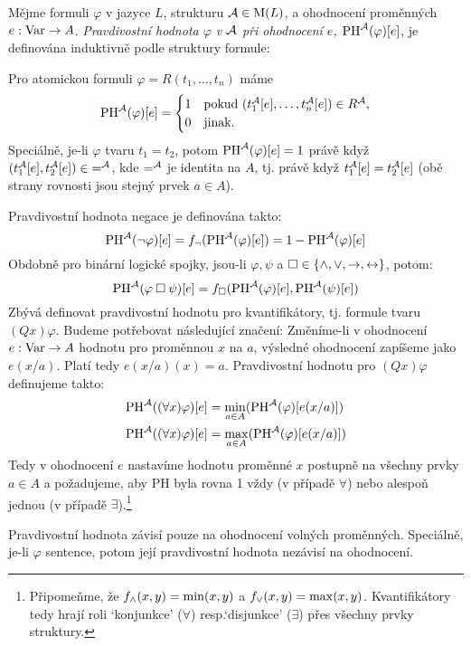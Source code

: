 \begin{definition}
Mějme formuli $\varphi$ v jazyce $L$, strukturu $\mathcal{A}\in\operatorname{M}(L)$,  a ohodnocení proměnných $e:\operatorname{Var}\to A$. \emph{Pravdivostní hodnota $\varphi$ v $\mathcal{A}$ při ohodnocení $e$, $\mathrm{PH}^{\mathcal{A}}(\varphi)[e]$}, je definována induktivně podle struktury formule:

Pro atomickou formuli $\varphi=R(t_1,\dots,t_n)$ máme 
$$
\mathrm{PH}^{\mathcal{A}}(\varphi)[e]=
\begin{cases}
    1 & \text{pokud }(t_1^{\mathcal{A}}[e],\dots,t_n^{\mathcal{A}}[e])\in R^{\mathcal{A}},\\
    0 & \text{jinak.}    
\end{cases}
$$
Speciálně, je-li $\varphi$ tvaru $t_1=t_2$, potom $\mathrm{PH}^{\mathcal{A}}(\varphi)[e]=1$ právě když $(t_1^{\mathcal{A}}[e],t_2^{\mathcal{A}}[e])\in {=^{\mathcal{A}}}$, kde $=^{\mathcal{A}}$ je identita na $A$, tj. právě když $t_1^{\mathcal{A}}[e]=t_2^{\mathcal{A}}[e]$ (obě strany rovnosti jsou stejný prvek $a\in A$).

Pravdivostní hodnota negace je definována takto:
$$
\mathrm{PH}^{\mathcal{A}}(\neg \varphi)[e]=f_\neg(\mathrm{PH}^{\mathcal{A}}(\varphi)[e])=1-\mathrm{PH}^{\mathcal{A}}(\varphi)[e]
$$
Obdobně pro binární logické spojky, jsou-li $\varphi,\psi$ a ${\mathbin{\square}}\in\{{\land},{\lor},{\mathbin{\rightarrow}},{\mathbin{\leftrightarrow}}\}$, potom:
$$
\mathrm{PH}^{\mathcal{A}}(\varphi\mathbin{\square}\psi)[e]=f_{\mathbin{\square}}(\mathrm{PH}^{\mathcal{A}}(\varphi)[e],\mathrm{PH}^{\mathcal{A}}(\psi)[e])
$$
Zbývá definovat pravdivostní hodnotu pro kvantifikátory, tj. formule tvaru $(Qx)\varphi$. Budeme potřebovat následující značení: Změníme-li v ohodnocení $e:\operatorname{Var}\to A$ hodnotu pro proměnnou $x$ na $a$, výsledné ohodnocení zapíšeme jako $e(x/a)$. Platí tedy $e(x/a)(x)=a$. Pravdivostní hodnotu pro $(Qx)\varphi$ definujeme takto:
\begin{align*}
    \mathrm{PH}^{\mathcal{A}}((\forall x)\varphi)[e]&=\min_{a\in A}(\mathrm{PH}^{\mathcal{A}}(\varphi)[e(x/a)])\\ 
    \mathrm{PH}^{\mathcal{A}}((\forall x)\varphi)[e]&=\max_{a\in A}(\mathrm{PH}^{\mathcal{A}}(\varphi)[e(x/a)])
\end{align*}
Tedy v ohodnocení $e$ nastavíme hodnotu proměnné $x$ postupně na všechny prvky $a\in A$ a požadujeme, aby PH byla rovna 1 vždy (v případě $\forall$) nebo alespoň jednou (v případě $\exists$).\footnote{Připomeňme, že $f_{\land}(x,y)=\min(x,y)$ a $f_{\lor}(x,y)=\max(x,y)$. Kvantifikátory tedy hrají roli `konjunkce' ($\forall$) resp.`disjunkce' ($\exists$) přes všechny prvky struktury.}
\end{definition}

\begin{remark}
    Pravdivostní hodnota závisí pouze na ohodnocení volných proměnných. Speciálně, je-li $\varphi$ sentence, potom její pravdivostní hodnota nezávisí na ohodnocení.
\end{remark}

